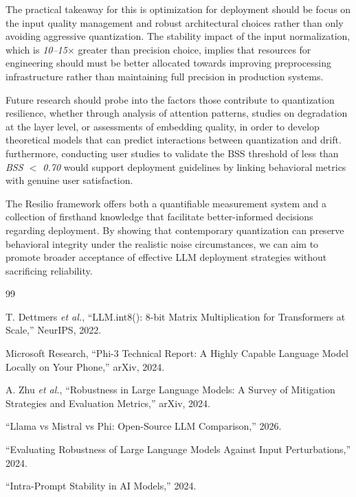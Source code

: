 \documentclass[conference]{IEEEtran}
\begin{document}
{The practical takeaway for this  is  optimization for deployment should be  focus on the  input quality management and robust architectural choices rather than only avoiding aggressive quantization. The stability impact of  the input normalization, which is \textit{10--15$\times$} greater than   precision choice, implies that resources for engineering should  must be better allocated towards improving  preprocessing infrastructure rather than maintaining full precision in production systems.

Future research should probe into the factors those contribute to quantization resilience, whether through analysis of attention patterns, studies on degradation at the layer level, or assessments of embedding quality, in order to develop theoretical models that can predict interactions between quantization and drift. furthermore, conducting user studies to validate the BSS threshold of less than \textit{BSS $<$ 0.70} would support deployment guidelines by linking behavioral metrics with genuine user satisfaction.

The Resilio framework offers both a quantifiable measurement system and a collection of firsthand knowledge that facilitate better-informed decisions regarding deployment. By showing that contemporary quantization can preserve behavioral integrity under the realistic noise circumstances, we  can aim to promote broader acceptance of effective LLM deployment strategies without sacrificing reliability.


\begin{thebibliography}{99}

 T. Dettmers \textit{et al.}, ``LLM.int8(): 8-bit Matrix Multiplication for Transformers at Scale,'' NeurIPS, 2022.

 Microsoft Research, ``Phi-3 Technical Report: A Highly Capable Language Model Locally on Your Phone,'' arXiv, 2024.

 A. Zhu \textit{et al.}, ``Robustness in Large Language Models: A Survey of Mitigation Strategies and Evaluation Metrics,'' arXiv, 2024.

 ``Llama vs Mistral vs Phi: Open-Source LLM Comparison,'' 2026.

 ``Evaluating Robustness of Large Language Models Against Input Perturbations,'' 2024.

 ``Intra-Prompt Stability in AI Models,'' 2024.


\end{thebibliography}}
\end{document}
